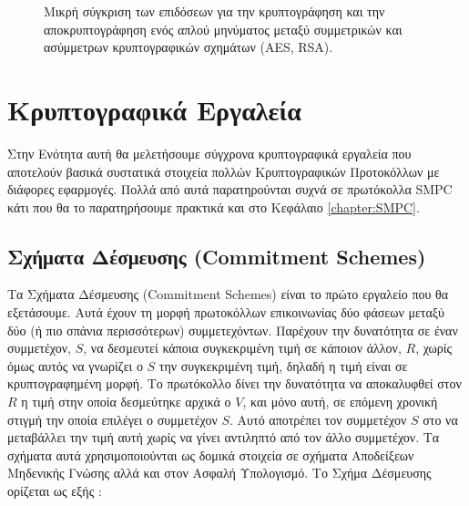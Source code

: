 \begin{figure}[h]
    \begin{center}
        \inputminted[fontsize=\scriptsize,frame=single]{python}{./01_body/code/rsa-vs-aes.py}
        \inputminted[fontsize=\scriptsize,frame=single]{text}{./01_body/code/rsa-vs-aes.output}
    \end{center}
    \caption{Μικρή σύγκριση των επιδόσεων για την κρυπτογράφηση και την αποκρυπτογράφηση ενός απλού μηνύματος μεταξύ συμμετρικών και ασύμμετρων κρυπτογραφικών σχημάτων (AES, RSA).}
    \label{code:rsa_vs_aes}
\end{figure}

\section{Κρυπτογραφικά Εργαλεία}

Στην Ενότητα αυτή θα μελετήσουμε σύγχρονα κρυπτογραφικά εργαλεία που αποτελούν βασικά συστατικά στοιχεία πολλών Κρυπτογραφικών Προτοκόλλων με διάφορες εφαρμογές. Πολλά από αυτά παρατηρούνται συχνά σε πρωτόκολλα SMPC κάτι που θα το παρατηρήσουμε πρακτικά και στο Κεφάλαιο \ref{chapter:SMPC}.

\subsection{Σχήματα Δέσμευσης (Commitment Schemes)}

Τα Σχήματα Δέσμευσης (Commitment Schemes) είναι το πρώτο εργαλείο που θα εξετάσουμε. Αυτά έχουν τη μορφή πρωτοκόλλων επικοινωνίας δύο φάσεων μεταξύ δύο (ή πιο σπάνια περισσότερων) συμμετεχόντων. Παρέχουν την δυνατότητα σε έναν συμμετέχον, $S$, να δεσμευτεί κάποια συγκεκριμένη τιμή σε κάποιον άλλον, $R$, χωρίς όμως αυτός να γνωρίζει ο $S$ την συγκεκριμένη τιμή, δηλαδή η τιμή είναι σε κρυπτογραφημένη μορφή. Το πρωτόκολλο δίνει την δυνατότητα να αποκαλυφθεί στον $R$ η τιμή στην οποία δεσμεύτηκε αρχικά ο $V$, και μόνο αυτή, σε επόμενη χρονική στιγμή την οποία επιλέγει ο συμμετέχον $S$. Αυτό αποτρέπει τον συμμετέχον $S$ στο να μεταβάλλει την τιμή αυτή χωρίς να γίνει αντιληπτό από τον άλλο συμμετέχον. Τα σχήματα αυτά χρησιμοποιούνται ως δομικά στοιχεία σε σχήματα Αποδείξεων Μηδενικής Γνώσης αλλά και στον Ασφαλή Υπολογισμό. Το Σχήμα Δέσμευσης ορίζεται ως εξής :


